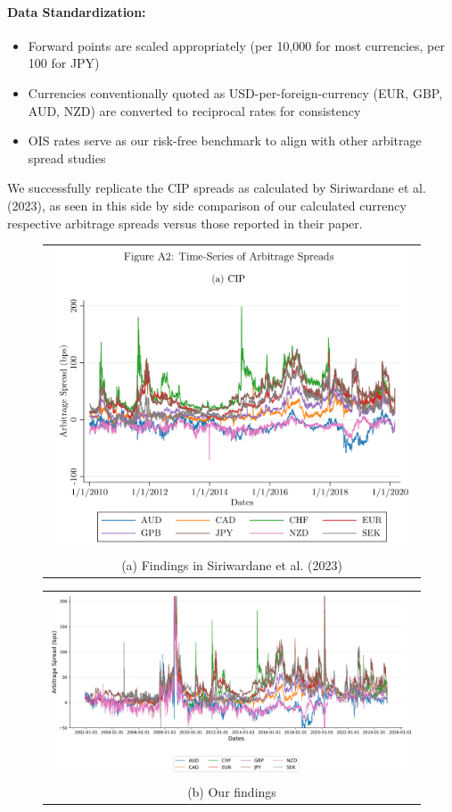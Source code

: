 \documentclass{article}
\begin{document}
\begin{appendices}
\paragraph{Data Standardization:}
\begin{itemize}
    \item Forward points are scaled appropriately (per 10,000 for most currencies, per 100 for JPY)
    \item Currencies conventionally quoted as USD-per-foreign-currency (EUR, GBP, AUD, NZD) are converted to reciprocal rates for consistency
    \item OIS rates serve as our risk-free benchmark to align with other arbitrage spread studies
\end{itemize}

We successfully replicate the CIP spreads as calculated by Siriwardane et al. (2023),
as seen in this side by side comparison of our calculated currency respective
arbitrage spreads versus those reported in their paper.

\begin{figure}
  \centering
  \begin{tabular}{@{}c@{}}
    \includegraphics[width=.7\linewidth]{../docs_src/SegArb_CIP_Timeseries.png} \\[\abovecaptionskip]
    \small (a) Findings in Siriwardane et al. (2023)
  \end{tabular}

  \vspace{\floatsep}

  \begin{tabular}{@{}c@{}}
    \includegraphics[width=.99\linewidth]{../docs_src/CIP_replicate.png} \\[\abovecaptionskip]
    \small (b) Our findings
  \end{tabular}


\end{figure}
\end{appendices}
\end{document}
